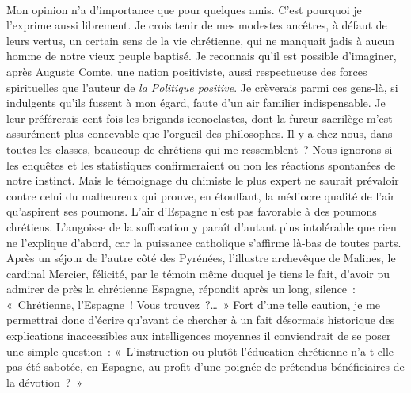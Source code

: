 \documentclass[french,twoside]{book} %
\begin{document}
\noindent  \par
Mon opinion n’a d’importance que pour quelques amis. C’est pourquoi je l’exprime aussi librement. Je crois tenir de mes modestes ancêtres, à défaut de leurs vertus, un certain sens de la vie chrétienne, qui ne manquait jadis à aucun homme de notre vieux peuple baptisé. Je reconnais qu’il est possible d’imaginer, après Auguste Comte, une nation positiviste, aussi respectueuse des forces spirituelles que l’auteur de \emph{la Politique positive}. Je crèverais parmi ces gens-là, si indulgents qu’ils fussent à mon égard, faute d’un air familier indispensable. Je leur préférerais cent fois les brigands iconoclastes, dont la fureur sacrilège m’est assurément plus concevable que l’orgueil des philosophes. Il y a chez nous, dans toutes les classes, beaucoup de chrétiens qui me ressemblent ? Nous ignorons si les enquêtes et les statistiques confirmeraient ou non les réactions spontanées de notre instinct. Mais le témoignage du chimiste le plus expert ne saurait prévaloir contre celui du malheureux qui prouve, en étouffant, la médiocre qualité de l’air qu’aspirent ses poumons. L’air d’Espagne n’est pas favorable à des poumons chrétiens. L’angoisse de la suffocation y paraît d’autant plus intolérable que rien ne l’explique d’abord, car la puissance catholique s’affirme là-bas de toutes parts. Après un séjour de l’autre côté des Pyrénées, l’illustre archevêque de Malines, le cardinal Mercier, félicité, par le témoin même duquel je tiens le fait, d’avoir pu admirer de près la chrétienne Espagne, répondit après un long, silence : « Chrétienne, l’Espagne ! Vous trouvez ?… » Fort d’une telle caution, je me permettrai donc d’écrire qu’avant de chercher à un fait désormais historique des explications inaccessibles aux intelligences moyennes il conviendrait de se poser une simple question : « L’instruction ou plutôt l’éducation chrétienne n’a-t-elle pas été sabotée, en Espagne, au profit d’une poignée de prétendus bénéficiaires de la dévotion ? »\par
\end{document}
